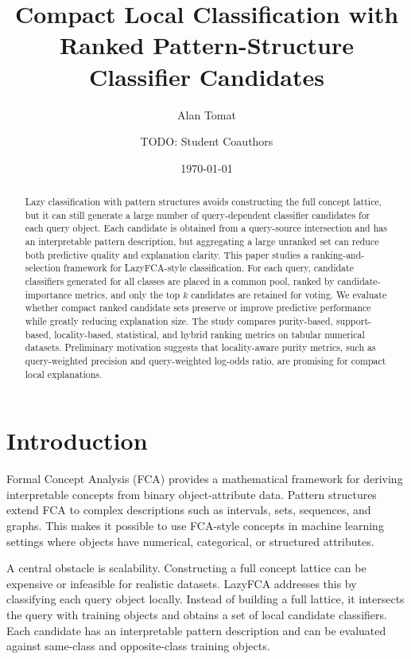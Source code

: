 \documentclass[11pt]{article}
\title{Compact Local Classification with Ranked Pattern-Structure Classifier Candidates}
\author{Alan Tomat \and TODO: Student Coauthors}
\date{\today}
\begin{document}
\maketitle

\begin{abstract}
Lazy classification with pattern structures avoids constructing the full
concept lattice, but it can still generate a large number of query-dependent
classifier candidates for each query object. Each candidate is obtained from a
query-source intersection and has an interpretable pattern description, but
aggregating a large unranked set can reduce both predictive quality and
explanation clarity. This paper studies a ranking-and-selection framework for
LazyFCA-style classification. For each query, candidate classifiers generated
for all classes are placed in a common pool, ranked by candidate-importance
metrics, and only the top $k$ candidates are retained for voting. We evaluate
whether compact ranked candidate sets preserve or improve predictive
performance while greatly reducing explanation size. The study compares
purity-based, support-based, locality-based, statistical, and hybrid ranking
metrics on tabular numerical datasets. Preliminary motivation suggests that
locality-aware purity metrics, such as query-weighted precision and
query-weighted log-odds ratio, are promising for compact local explanations.
\end{abstract}

\section{Introduction}

Formal Concept Analysis (FCA) provides a mathematical framework for deriving
interpretable concepts from binary object-attribute data. Pattern structures
extend FCA to complex descriptions such as intervals, sets, sequences, and
graphs. This makes it possible to use FCA-style concepts in machine learning
settings where objects have numerical, categorical, or structured attributes.

A central obstacle is scalability. Constructing a full concept lattice can be
expensive or infeasible for realistic datasets. LazyFCA addresses this by
classifying each query object locally. Instead of building a full lattice, it
intersects the query with training objects and obtains a set of local
candidate classifiers. Each candidate has an interpretable pattern description
and can be evaluated against same-class and opposite-class training objects.
\end{document}
